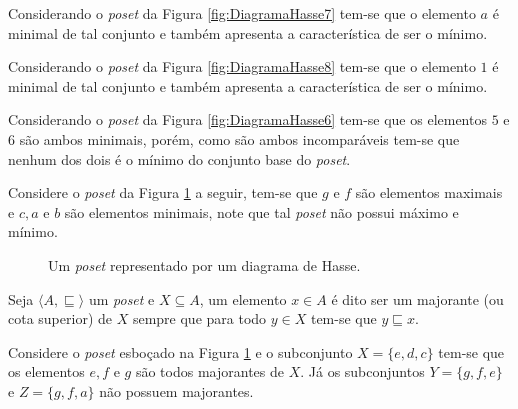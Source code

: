 \begin{exemplo}
	Considerando o \textit{poset} da Figura \ref{fig:DiagramaHasse7} tem-se que o elemento $a$ é minimal de tal conjunto e também apresenta a característica de ser o mínimo.
\end{exemplo}

\begin{exemplo}
	Considerando o \textit{poset} da Figura \ref{fig:DiagramaHasse8} tem-se que o elemento $1$ é minimal de tal conjunto e também apresenta a característica de ser o mínimo.
\end{exemplo}

\begin{exemplo}
	Considerando o \textit{poset} da Figura \ref{fig:DiagramaHasse6} tem-se que os elementos $5$ e $6$ são ambos minimais, porém, como são ambos incomparáveis tem-se que nenhum dos dois é o mínimo do conjunto base do \textit{poset}.
\end{exemplo}

\begin{exemplo}
  Considere o \textit{poset} da Figura \ref{fig:DiagramaHasse9} a seguir, tem-se que $g$ e $f$ são elementos maximais e $c, a$ e $b$ são elementos minimais, note que tal \textit{poset} não possui máximo e mínimo.
\end{exemplo}

\begin{figure}[h]
  \centering
  \caption{Um \textit{poset} representado por um diagrama de Hasse.}
  \label{fig:DiagramaHasse9}
\end{figure}

\begin{definicao}[Majorante]\label{def:Majorante}
	Seja $\langle A, \sqsubseteq \rangle$ um \textit{poset} e $X \subseteq A$, um elemento $x \in A$ é dito ser um majorante (ou cota superior) de $X$ sempre que para todo $y \in X$ tem-se que $y\sqsubseteq x$.
\end{definicao}

\begin{exemplo}
	Considere o \textit{poset} esboçado na Figura \ref{fig:DiagramaHasse9} e o subconjunto $X = \{e, d, c\}$ tem-se que os elementos $e, f$ e $g$ são todos majorantes de $X$. Já os subconjuntos $Y = \{g, f, e\}$ e $Z = \{g, f, a\}$ não possuem majorantes.
\end{exemplo}

